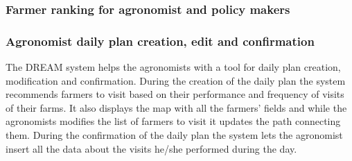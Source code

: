 \subsubsection{Farmer ranking for agronomist and policy makers}
\subsubsection{Agronomist daily plan creation, edit and confirmation}
The DREAM system helps the agronomists with a tool for daily plan creation, modification and confirmation. During the creation of the daily plan the system recommends farmers to visit based on their performance and frequency of visits of their farms. It also displays the map with all the farmers' fields and while the agronomists modifies the list of farmers to visit it updates the path connecting them. During the confirmation of the daily plan the system lets the agronomist insert all the data about the visits he/she performed during the day.





